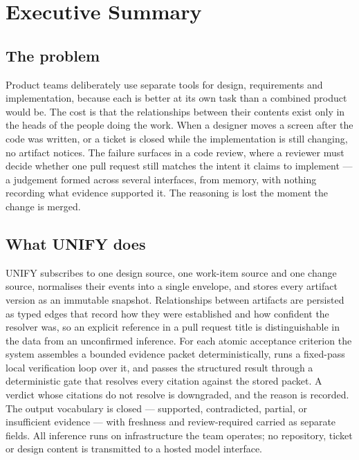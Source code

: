 \chapter*{Executive Summary}

\section*{The problem}

Product teams deliberately use separate tools for design, requirements and
implementation, because each is better at its own task than a combined product
would be. The cost is that the relationships between their contents exist only
in the heads of the people doing the work. When a designer moves a screen after
the code was written, or a ticket is closed while the implementation is still
changing, no artifact notices. The failure surfaces in a code review, where a
reviewer must decide whether one pull request still matches the intent it
claims to implement --- a judgement formed across several interfaces, from
memory, with nothing recording what evidence supported it. The reasoning is lost
the moment the change is merged.

\section*{What UNIFY does}

UNIFY subscribes to one design source, one work-item source and one change
source, normalises their events into a single envelope, and stores every
artifact version as an immutable snapshot. Relationships between artifacts are
persisted as typed edges that record how they were established and how confident
the resolver was, so an explicit reference in a pull request title is
distinguishable in the data from an unconfirmed inference. For each atomic
acceptance criterion the system assembles a bounded evidence packet
deterministically, runs a fixed-pass local verification loop over it, and passes
the structured result through a deterministic gate that resolves every citation
against the stored packet. A verdict whose citations do not resolve is
downgraded, and the reason is recorded. The output vocabulary is closed ---
supported, contradicted, partial, or insufficient evidence --- with freshness
and review-required carried as separate fields. All inference runs on
infrastructure the team operates; no repository, ticket or design content is
transmitted to a hosted model interface.

